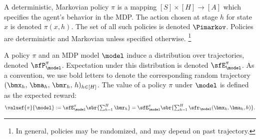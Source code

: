 
A deterministic, Markovian policy $\pi$ is a mapping
    $[S]\times[H]\to [A]$
which specifies the agent's behavior in the MDP. The action chosen at stage $h$ for state $x$ is denoted $\pi(x,h)$.
The set of all such policies is denoted $\Pimarkov$. Policies are deterministic and Markovian unless specified otherwise.%
\footnote{In general, policies may be randomized, and may depend on past trajectory.}



A policy $\pi$ and an MDP model $\model$ induce a distribution over trajectories, denoted $\sfP^{\pi}_{\model}$. Expectation under this distribution is denoted $\sfE^{\pi}_{\model}$. As a convention, we use bold letters to denote the corresponding random trajectory
    $(\bmx_{h},\,\bma_h,\,\bmr_h,\,h)_{h\in[H]}$.
The value of a policy $\pi$ under $\model$ is defined as the expected reward:
\[\valuef{\pi}{\model} := \textstyle
    \sfE^{\pi}_{\model}\sbr{\sum_{h=1}^H \bmr_h}
    = \sfE^{\pi}_{\model}\sbr{\sum_{h=1}^H \sfr_{\model}(\bmx_h,\bma_h,h)}.\]

